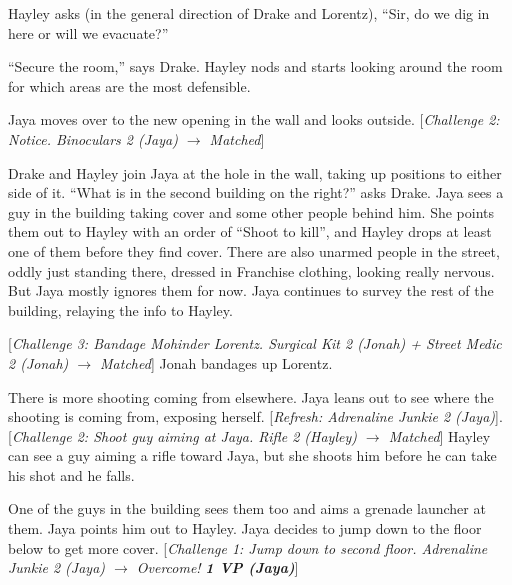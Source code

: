 Hayley asks (in the general direction of Drake and Lorentz), ``Sir, do we dig in here or will we evacuate?''

``Secure the room,'' says Drake.  Hayley nods and starts looking around the room for which areas are the most defensible.



Jaya moves over to the new opening in the wall and looks outside.  {[}\textit{Challenge 2: Notice.  Binoculars 2 (Jaya) $\rightarrow$ Matched}{]}



Drake and Hayley join Jaya at the hole in the wall, taking up positions to either side of it.  ``What is in the second building on the right?'' asks Drake.  Jaya sees a guy in the building taking cover and some other people behind him.  She points them out to Hayley with an order of ``Shoot to kill'', and Hayley drops at least one of them before they find cover. There are also unarmed people in the street, oddly just standing there, dressed in Franchise clothing, looking really nervous.  But Jaya mostly ignores them for now.  Jaya continues to survey the rest of the building, relaying the info to Hayley.



{[}\textit{Challenge 3: Bandage Mohinder Lorentz.  Surgical Kit 2 (Jonah) + Street Medic 2 (Jonah) $\rightarrow$ Matched}{]}  Jonah bandages up Lorentz.



There is more shooting coming from elsewhere.  Jaya leans out to see where the shooting is coming from, exposing herself.  {[}\textit{Refresh: Adrenaline Junkie 2 (Jaya)}{]}.  {[}\textit{Challenge 2: Shoot guy aiming at Jaya. Rifle 2 (Hayley) $\rightarrow$ Matched}{]}  Hayley can see a guy aiming a rifle toward Jaya, but she shoots him before he can take his shot and he falls.



One of the guys in the building sees them too and aims a grenade launcher at them.  Jaya points him out to Hayley.  Jaya decides to jump down to the floor below to get more cover.  {[}\textit{Challenge 1: Jump down to second floor.  Adrenaline Junkie 2 (Jaya)  $\rightarrow$ Overcome! }\textit{\textbf{1 VP (Jaya)}}{]}



